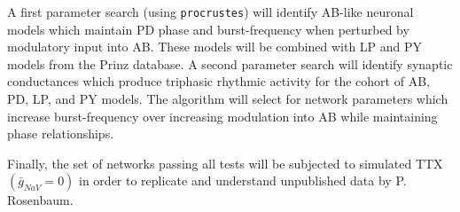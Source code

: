 \documentclass[14pt]{article}
\begin{document}
	A first parameter search (using \texttt{procrustes}) will identify AB-like neuronal models which maintain PD phase and burst-frequency when perturbed by modulatory input into AB. These models will be combined with LP and PY models from the Prinz database. A second parameter search will identify synaptic conductances which produce triphasic rhythmic activity for the cohort of AB, PD, LP, and PY models. The algorithm will select for network parameters which increase burst-frequency over increasing modulation into AB while maintaining phase relationships. 
	
	Finally, the set of networks passing all tests will be subjected to simulated TTX $(\bar{g}_{NaV} = 0)$ in order to replicate and understand unpublished data by P. Rosenbaum.

	\medskip
	\FloatBarrier
	\printbibliography
\end{document}
